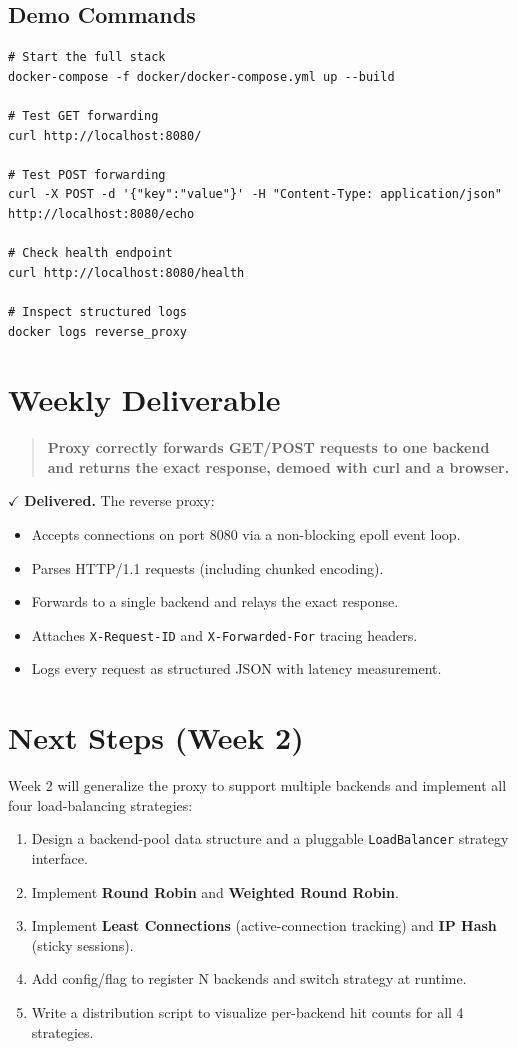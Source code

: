\documentclass[11pt, a4paper]{article}
\begin{document}
\subsection{Demo Commands}
\begin{lstlisting}
# Start the full stack
docker-compose -f docker/docker-compose.yml up --build

# Test GET forwarding
curl http://localhost:8080/

# Test POST forwarding
curl -X POST -d '{"key":"value"}' -H "Content-Type: application/json" http://localhost:8080/echo

# Check health endpoint
curl http://localhost:8080/health

# Inspect structured logs
docker logs reverse_proxy
\end{lstlisting}

\section{Weekly Deliverable}

\begin{quote}
\textbf{Proxy correctly forwards GET/POST requests to one backend and returns the exact response, demoed with curl and a browser.}
\end{quote}

$\checkmark$ \textbf{Delivered.} The reverse proxy:
\begin{itemize}
    \item Accepts connections on port 8080 via a non-blocking epoll event loop.
    \item Parses HTTP/1.1 requests (including chunked encoding).
    \item Forwards to a single backend and relays the exact response.
    \item Attaches \texttt{X-Request-ID} and \texttt{X-Forwarded-For} tracing headers.
    \item Logs every request as structured JSON with latency measurement.
\end{itemize}

\section{Next Steps (Week 2)}

Week 2 will generalize the proxy to support multiple backends and implement all four load-balancing strategies:
\begin{enumerate}
    \item Design a backend-pool data structure and a pluggable \texttt{LoadBalancer} strategy interface.
    \item Implement \textbf{Round Robin} and \textbf{Weighted Round Robin}.
    \item Implement \textbf{Least Connections} (active-connection tracking) and \textbf{IP Hash} (sticky sessions).
    \item Add config/flag to register N backends and switch strategy at runtime.
    \item Write a distribution script to visualize per-backend hit counts for all 4 strategies.
\end{enumerate}
\end{document}
